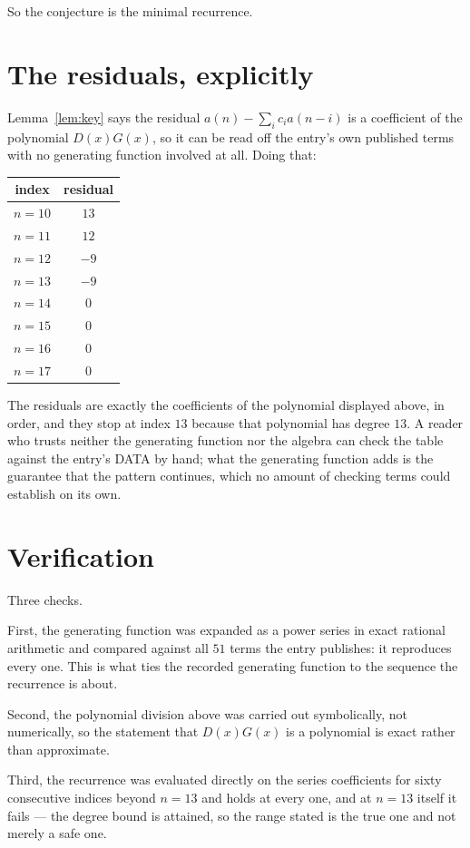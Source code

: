 \documentclass[11pt,a4paper]{article}
\theoremstyle{plain}
\theoremstyle{definition}
\begin{document}
So the conjecture is the minimal recurrence.

\section{The residuals, explicitly}

Lemma~\ref{lem:key} says the residual $a(n)-\sum_ic_ia(n-i)$ is a coefficient of the
polynomial $D(x)G(x)$, so it can be read off the entry's own published terms with no
generating function involved at all. Doing that:
\begin{center}
\begin{tabular}{cc}
index & residual \\ \hline
$n=10$ & $13$ \\
$n=11$ & $12$ \\
$n=12$ & $-9$ \\
$n=13$ & $-9$ \\
$n=14$ & $0$ \\
$n=15$ & $0$ \\
$n=16$ & $0$ \\
$n=17$ & $0$
\end{tabular}
\end{center}
The residuals are exactly the coefficients of the polynomial displayed above, in order, and
they stop at index $13$ because that polynomial has degree $13$. A reader who trusts
neither the generating function nor the algebra can check the table against the entry's DATA
by hand; what the generating function adds is the guarantee that the pattern continues, which
no amount of checking terms could establish on its own.

\section{Verification}

Three checks.

First, the generating function was expanded as a power series in exact rational arithmetic and
compared against all $51$ terms the entry publishes: it reproduces every one. This is
what ties the recorded generating function to the sequence the recurrence is about.

Second, the polynomial division above was carried out symbolically, not numerically, so the
statement that $D(x)G(x)$ is a polynomial is exact rather than approximate.

Third, the recurrence was evaluated directly on the series coefficients for sixty consecutive
indices beyond $n=13$ and holds at every one, and at $n=13$ itself it fails --- the
degree bound is attained, so the range stated is the true one and not merely a safe one.
\end{document}
